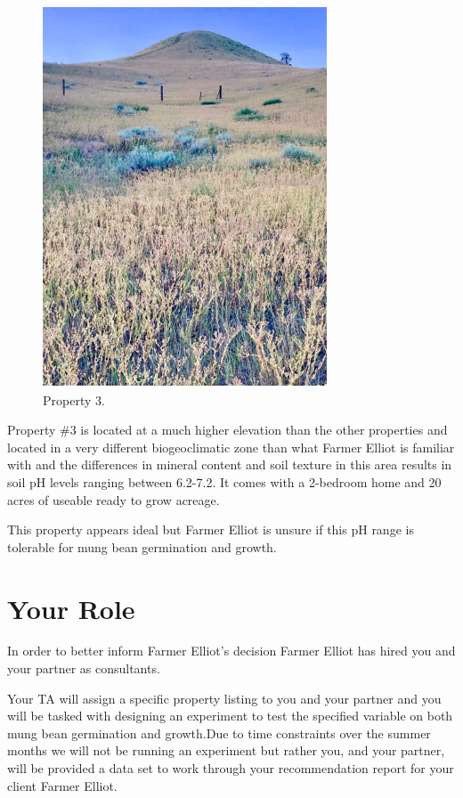 \documentclass[
]{book}
\begin{document}
\begin{figure}
\centering
\includegraphics{images/prop-3.png}
\caption{Property 3.}
\end{figure}

Property \#3 is located at a much higher elevation than the other properties and located in a very different biogeoclimatic zone than what Farmer Elliot is familiar with and the differences in mineral content and soil texture in this area results in soil pH levels ranging between 6.2-7.2. It comes with a 2-bedroom home and 20 acres of useable ready to grow acreage.

This property appears ideal but Farmer Elliot is unsure if this pH range is tolerable for mung bean germination and growth.

\hypertarget{your-role}{%
\section*{Your Role}\label{your-role}}

In order to better inform Farmer Elliot's decision Farmer Elliot has hired you and your partner as consultants.

Your TA will assign a specific property listing to you and your partner and you will be tasked with designing an experiment to test the specified variable on both mung bean germination and growth.Due to time constraints over the summer months we will not be running an experiment but rather you, and your partner, will be provided a data set to work through your recommendation report for your client Farmer Elliot.
\end{document}
